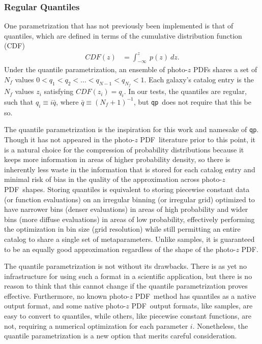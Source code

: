 \documentclass[\docopts]{\docclass}
\newcommand{\qp}{\texttt{qp}}
\newcommand{\pz}{photo-$z$ PDF}
\begin{document}
\subsubsection{Regular Quantiles}
\label{sec:quantiles}

One parametrization that has not previously been implemented is that of 
quantiles, which are defined in terms of the cumulative distribution function 
(CDF)
\begin{align}
  \label{eq:cdf}
  CDF(z) &= \int_{-\infty}^{z}\ p(z)\ dz.
\end{align}
Under the quantile parametrization, an ensemble of \pz s shares a set of 
$N_{f}$ values $0<q_{1}<q_{2}<\dots<q_{N-1}<q_{N_{f}}<1$.  Each galaxy's 
catalog entry is the $N_{f}$ values $z_{i}$ satisfying $CDF(z_{i})=q_{i}$.  In 
our tests, the quantiles are regular, such that $q_{i}\equiv i\bar{q}$, where 
$\bar{q}\equiv(N_{f}+1)^{-1}$, but \qp\ does not require that this be so.

The quantile parametrization is the inspiration for this work and namesake of 
\qp.  Though it has not appeared in the \pz\ literature prior to this point, it 
is a natural choice for the compression of probability distributions because it 
keeps more information in areas of higher probability density, so there is 
inherently less waste in the information that is stored for each catalog entry 
and minimal risk of bias in the quality of the approximation across \pz\ 
shapes.  Storing quantiles is equivalent to storing piecewise constant data (or 
function evaluations) on an irregular binning (or irregular grid) optimized to 
have narrower bins (denser evaluations) in areas of high probability and wider 
bins (more diffuse evaluations) in areas of low probability, effectively 
performing the optimization in bin size (grid resolution) while still 
permitting an entire catalog to share a single set of metaparameters.  Unlike 
samples, it is guaranteed to be an equally good approximation regardless of the 
shape of the \pz.

The quantile parametrization is not without its drawbacks.  There is as yet no 
infrastructure for using such a format in a scientific application, but there 
is no reason to think that this cannot change if the quantile parametrization 
proves effective.  Furthermore, no known \pz\ method has quantiles as a native 
output format, and some native \pz\ output formats, like samples, are easy to 
convert to quantiles, while others, like piecewise constant functions, are not, 
requiring a numerical optimization for each parameter $i$.  Nonetheless, the 
quantile parametrization is a new option that merits careful consideration.
\end{document}
